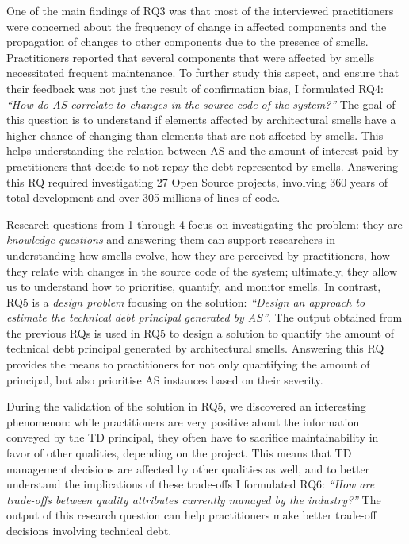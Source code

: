 One of the main findings of RQ3 was that most of the interviewed practitioners were concerned about the frequency of change in affected components and the propagation of changes to other components due to the presence of smells. 
Practitioners reported that several components that were affected by smells necessitated frequent maintenance.
To further study this aspect, and ensure that their feedback was not just the result of confirmation bias, I formulated RQ4: \textit{``How do AS correlate to changes in the source code of the system?''}
The goal of this question is to understand if elements affected by architectural smells have a higher chance of changing than elements that are not affected by smells.
This helps understanding the relation between AS and the amount of interest paid by practitioners that decide to not repay the debt represented by smells.
Answering this RQ required investigating 27 Open Source projects, involving 360 years of total development and over 305 millions of lines of code.

Research questions from 1 through 4 focus on investigating the problem: they are \emph{knowledge questions} and answering them can support researchers in understanding how smells evolve, how they are perceived by practitioners, how they relate with changes in the source code of the system; ultimately, they allow us to understand how to prioritise, quantify, and monitor smells.
In contrast, RQ5 is a \emph{design problem} focusing on the solution: \textit{``Design an approach to estimate the technical debt principal generated by AS''}.
The output obtained from the previous RQs is used in RQ5 to design a solution to quantify the amount of technical debt principal generated by architectural smells.
Answering this RQ provides the means to practitioners for not only quantifying the amount of principal, but also prioritise AS instances based on their severity.

During the validation of the solution in RQ5, we discovered an interesting phenomenon: while practitioners are very positive about the information conveyed by the TD principal, they often have to sacrifice maintainability in favor of other qualities, depending on the project.
This means that TD management decisions are affected by other qualities as well, and to better understand the implications of these trade-offs I formulated RQ6: \textit{``How are trade-offs between quality attributes currently managed by the industry?''}
The output of this research question can help practitioners make better trade-off decisions involving technical debt.

